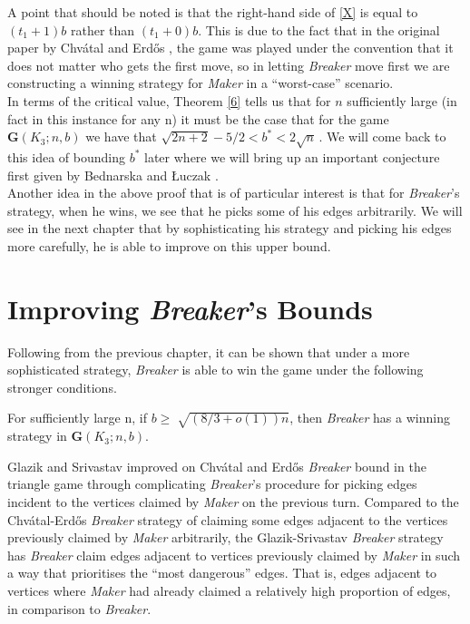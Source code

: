 \documentclass[a4paper,oneside,11pt]{report}
\begin{document}
A point that should be noted is that the right-hand side of \eqref{X} is equal to $(t_1+1)b$ rather than $(t_1+0)b$. This is due to the fact that in the original paper by Chvátal and Erdős \cite{chvatal1978biased}, the game was played under the convention that it does not matter who gets the first move, so in letting \textit{Breaker} move first we are constructing a winning strategy for \textit{Maker} in a ``worst-case'' scenario.\\

In terms of the critical value, Theorem \ref{6} tells us that for $n$ sufficiently large (in fact in this instance for any n) it must be the case that for the game $\textbf{G}(K_3;n,b)$ we have that $\sqrt{2n+2}-5/2 < b^* < 2\sqrt{n}\,.$ We will come back to this idea of bounding $b^*$ later where we will bring up an important conjecture first given by Bednarska and \L{}uczak \cite{bednarska2000biased}.\\ 

Another idea in the above proof that is of particular interest is that for \textit{Breaker}'s strategy, when he wins, we see that he picks some of his edges arbitrarily. We will see in the next chapter that by sophisticating his strategy and picking his edges more carefully, he is able to improve on this upper bound. 

\chapter{Improving \textit{Breaker}'s Bounds}

Following from the previous chapter, it can be shown that under a more sophisticated strategy, \textit{Breaker} is able to win the game under the following stronger conditions. 

\begin{theorem}\label{Glaik}

For sufficiently large n, if $b \geqslant \sqrt[]{(8/3 + o(1))n}$, then \textit{Breaker} has a winning strategy in $\textbf{G}(K_3;n,b)$.
    
\end{theorem}

Glazik and Srivastav improved on Chvátal and Erdős \textit{Breaker} bound in the triangle game through complicating \textit{Breaker}'s procedure for picking edges incident to the vertices claimed by \textit{Maker} on the previous turn. Compared to the Chvátal-Erdős \textit{Breaker} strategy of claiming some edges adjacent to the vertices previously claimed by \textit{Maker} arbitrarily, the Glazik-Srivastav \textit{Breaker} strategy has \textit{Breaker} claim edges adjacent to vertices previously claimed by \textit{Maker} in such a way that prioritises the ``most dangerous'' edges. That is, edges adjacent to vertices where \textit{Maker} had already claimed a relatively high proportion of edges, in comparison to \textit{Breaker}.\\
\end{document}
